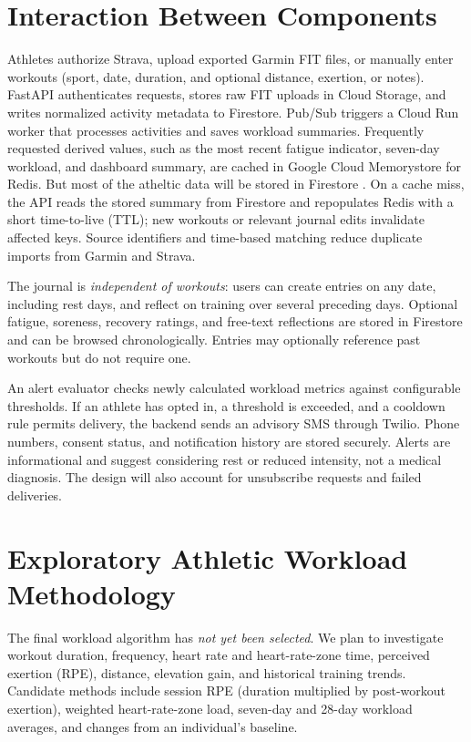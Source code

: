 \documentclass[11pt,letterpaper]{article}
\begin{document}
\section{Interaction Between Components}
Athletes authorize Strava, upload exported Garmin FIT files, or manually enter workouts (sport, date, duration, and optional distance, exertion, or notes). FastAPI authenticates requests, stores raw FIT uploads in Cloud Storage, and writes normalized activity metadata to Firestore. Pub/Sub triggers a Cloud Run worker that processes activities and saves workload summaries. Frequently requested derived values, such as the most recent fatigue indicator, seven-day workload, and dashboard summary, are cached in Google Cloud Memorystore for Redis. But most of the atheltic data will be stored in Firestore . On a cache miss, the API reads the stored summary from Firestore and repopulates Redis with a short time-to-live (TTL); new workouts or relevant journal edits invalidate affected keys. Source identifiers and time-based matching reduce duplicate imports from Garmin and Strava.

The journal is \emph{independent of workouts}: users can create entries on any date, including rest days, and reflect on training over several preceding days. Optional fatigue, soreness, recovery ratings, and free-text reflections are stored in Firestore and can be browsed chronologically. Entries may optionally reference past workouts but do not require one.

An alert evaluator checks newly calculated workload metrics against configurable thresholds. If an athlete has opted in, a threshold is exceeded, and a cooldown rule permits delivery, the backend sends an advisory SMS through Twilio. Phone numbers, consent status, and notification history are stored securely. Alerts are informational and suggest considering rest or reduced intensity, not a medical diagnosis. The design will also account for unsubscribe requests and failed deliveries.

\section{Exploratory Athletic Workload Methodology}
The final workload algorithm has \emph{not yet been selected}. We plan to investigate workout duration, frequency, heart rate and heart-rate-zone time, perceived exertion (RPE), distance, elevation gain, and historical training trends. Candidate methods include session RPE (duration multiplied by post-workout exertion), weighted heart-rate-zone load, seven-day and 28-day workload averages, and changes from an individual's baseline. 
\end{document}

